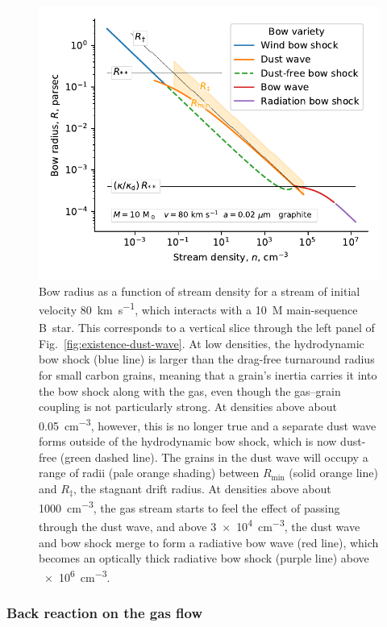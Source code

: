 \message{ !name(dusty-bow-wave.tex)}\documentclass[useAMS, usenatbib, a4paper]{mnras}
\newcommand\Rmin{\ensuremath{R_{\scriptscriptstyle\text{min}}}}
\begin{document}
\begin{figure}
  \includegraphics[width=\linewidth]{figs/onaxis-stats-plot-MS10-v080-gra002}
  \caption{Bow radius as a function of stream density for a stream of
    initial velocity \SI{80}{km.s^{-1}}, which interacts with a
    \SI{10}{M_\odot} main-sequence B~star.  This corresponds to a vertical
    slice through the left panel of
    Fig.~\ref{fig:existence-dust-wave}.  At low densities, the
    hydrodynamic bow shock (blue line) is larger than the drag-free
    turnaround radius for small carbon grains, meaning that a grain's
    inertia carries it into the bow shock along with the gas, even
    though the gas--grain coupling is not particularly strong.  At
    densities above about \SI{0.05}{cm^{-3}}, however, this is no
    longer true and a separate dust wave forms outside of the
    hydrodynamic bow shock, which is now dust-free (green dashed
    line).  The grains in the dust wave will occupy a range of radii
    (pale orange shading) between \(\Rmin\) (solid orange line) and
    \(R_\ddag\), the stagnant drift radius.  At densities above about
    \SI{1000}{cm^{-3}}, the gas stream starts to feel the effect of
    passing through the dust wave, and above \SI{3e4}{cm^{-3}}, the
    dust wave and bow shock merge to form a radiative bow wave (red
    line), which becomes an optically thick radiative bow shock
    (purple line) above \SI{e6}{cm^{-3}}.}
  \label{fig:decouple-vertical-cut}
\end{figure}

\subsubsection{Back reaction on the gas flow}
\label{sec:back-reaction-gas}
\end{document}
